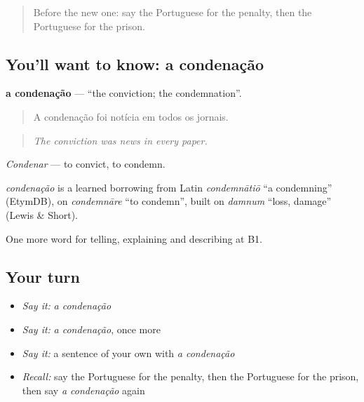 \label{lesson:PT-C388-condenacao}



\begin{quote}
Before the new one: say the Portuguese for the penalty, then the Portuguese for the prison.
\end{quote}

\subsection*{You'll want to know: a condenação}
\textbf{a condenação} — \textquotedblleft{}the conviction; the condemnation\textquotedblright{}.

\begin{quote}
A condenação foi notícia em todos os jornais.
\end{quote}

\begin{quote}
\emph{The conviction was news in every paper.}
\end{quote}

\emph{Condenar} — to convict, to condemn.

\begin{cousinweb}
\emph{condenação} is a learned borrowing from Latin \emph{condemnātiō} \textquotedblleft{}a condemning\textquotedblright{} (EtymDB), on \emph{condemnāre} \textquotedblleft{}to condemn\textquotedblright{}, built on \emph{damnum} \textquotedblleft{}loss, damage\textquotedblright{} (Lewis \& Short).
\end{cousinweb}

\begin{grammarlens}[title={What you've built}]
One more word for telling, explaining and describing at B1.
\end{grammarlens}

\subsection*{Your turn}
\begin{itemize}
\raggedright
  \item \emph{Say it:} \emph{a condenação}
  \item \emph{Say it:} \emph{a condenação}, once more
  \item \emph{Say it:} a sentence of your own with \emph{a condenação}
  \item \emph{Recall:} say the Portuguese for the penalty, then the Portuguese for the prison, then say \emph{a condenação} again
\end{itemize}

